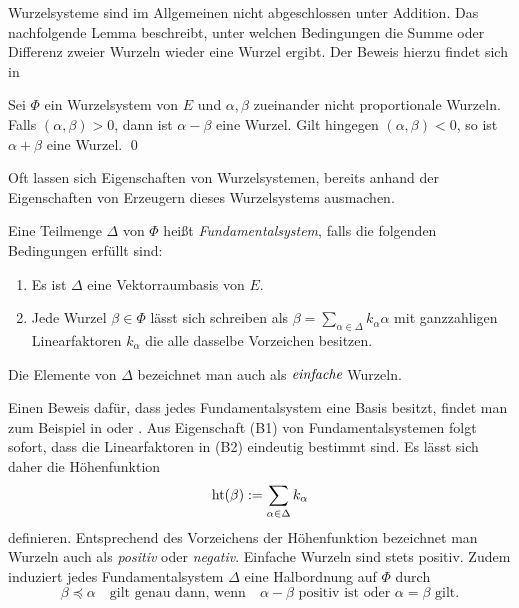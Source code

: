 Wurzelsysteme sind im Allgemeinen nicht abgeschlossen unter Addition. 
Das nachfolgende Lemma beschreibt, unter welchen Bedingungen die Summe oder Differenz zweier Wurzeln wieder eine Wurzel ergibt. Der Beweis hierzu findet sich in \cite[S.45]{humphreys1972introduction}

\begin{lem}
  \label{lem:sumDiffRoot}
  Sei $\Phi$ ein Wurzelsystem von $E$ und $\alpha, \beta$ zueinander nicht proportionale Wurzeln.
  Falls $(\alpha, \beta) > 0$, dann ist $\alpha - \beta$ eine Wurzel.
  Gilt hingegen $(\alpha, \beta) < 0$, so ist $\alpha + \beta$ eine Wurzel. \qed
\end{lem}

Oft lassen sich Eigenschaften von Wurzelsystemen, bereits anhand der Eigenschaften von Erzeugern dieses Wurzelsystems ausmachen.

\begin{defn}
  Eine Teilmenge $\Delta$ von $\Phi$ heißt \emph{Fundamentalsystem}, falls die folgenden Bedingungen erfüllt sind:
  \begin{enumerate}[(B1)]
    \item Es ist $\Delta$ eine Vektorraumbasis von $E$.
    \item Jede Wurzel $\beta \in \Phi$ lässt sich schreiben als $\beta = \sum_{\alpha \in \Delta} k_\alpha \alpha$ mit ganzzahligen Linearfaktoren $k_\alpha$ die alle dasselbe Vorzeichen besitzen.
  \end{enumerate}
  Die Elemente von $\Delta$ bezeichnet man auch als $\emph{einfache}$ Wurzeln.
\end{defn}

\begin{bem}
  Einen Beweis dafür, dass jedes Fundamentalsystem eine Basis besitzt, findet man zum Beispiel in \cite[S.48]{humphreys1972introduction} oder \cite[S.116]{erdmann2006introduction}.
  Aus Eigenschaft (B1) von Fundamentalsystemen folgt sofort, dass die Linearfaktoren in (B2) eindeutig bestimmt sind. 
  Es lässt sich daher die Höhenfunktion 
  \begin{displaymath}
    \operatorname{ht}(\beta) := \sum_{\alpha \in \Delta} k_\alpha 
  \end{displaymath}
  definieren.
  Entsprechend des Vorzeichens der Höhenfunktion bezeichnet man Wurzeln auch als \emph{positiv} oder \emph{negativ}.
  Einfache Wurzeln sind stets positiv.
  Zudem induziert jedes Fundamentalsystem $\Delta$ eine Halbordnung auf $\Phi$ durch
  \begin{displaymath}
    \beta \preceq \alpha \quad \text{gilt genau dann, wenn} \quad \alpha - \beta \text{ positiv ist oder } \alpha = \beta \text{ gilt}.
  \end{displaymath}
\end{bem}


